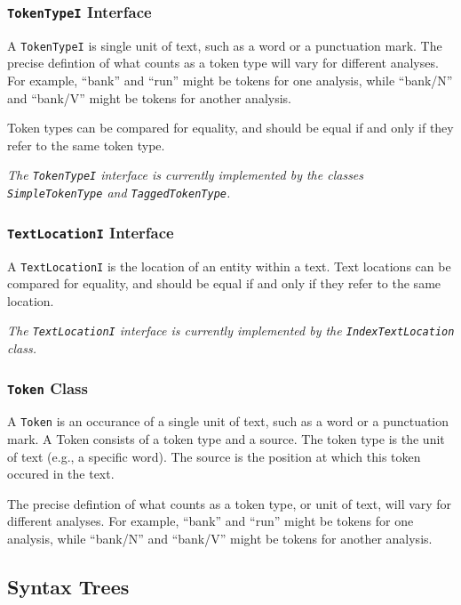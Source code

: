 \documentclass{article}
\begin{document}
\subsubsection{\texttt{TokenTypeI} Interface}

    A \texttt{TokenTypeI} is single unit of text, such as a word or a
    punctuation mark.  The precise defintion of what counts as a token
    type will vary for different analyses.  For example, ``bank'' and
    ``run'' might be tokens for one analysis, while ``bank/N'' and
    ``bank/V'' might be tokens for another analysis.

    Token types can be compared for equality, and should be equal if
    and only if they refer to the same token type.

\vspace{2mm}\noindent
\textit{The \texttt{TokenTypeI} interface is currently implemented by
the classes \texttt{SimpleTokenType} and \texttt{TaggedTokenType}.}

\subsubsection{\texttt{TextLocationI} Interface}

    A \texttt{TextLocationI} is the location of an entity within a
    text.  Text locations can be compared for equality, and should be
    equal if and only if they refer to the same location.

\vspace{2mm}\noindent
\textit{The \texttt{TextLocationI} interface is currently implemented
by the \texttt{IndexTextLocation} class.}

\subsubsection{\texttt{Token} Class}

    A \texttt{Token} is an occurance of a single unit of text, such as
    a word or a punctuation mark.  A Token consists of a token type
    and a source.  The token type is the unit of text (e.g., a
    specific word).  The source is the position at which this token
    occured in the text.

    The precise defintion of what counts as a token type, or unit of
    text, will vary for different analyses.  For example, ``bank'' and 
    ``run'' might be tokens for one analysis, while ``bank/N'' and
    ``bank/V'' might be tokens for another analysis.

\subsection{Syntax Trees}
\end{document}
